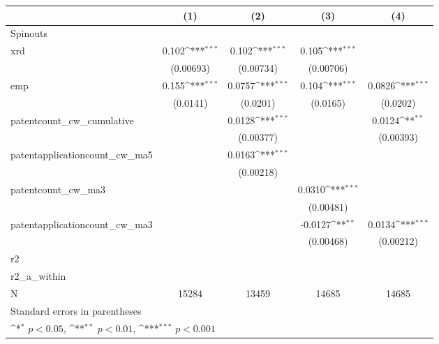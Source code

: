 {
\def\sym#1{\ifmmode^{#1}\else\(^{#1}\)\fi}
\begin{tabular}{l*{4}{c}}
\hline\hline
            &\multicolumn{1}{c}{(1)}         &\multicolumn{1}{c}{(2)}         &\multicolumn{1}{c}{(3)}         &\multicolumn{1}{c}{(4)}         \\
\hline
Spinouts    &                     &                     &                     &                     \\
xrd         &       0.102\sym{***}&       0.102\sym{***}&       0.105\sym{***}&                     \\
            &   (0.00693)         &   (0.00734)         &   (0.00706)         &                     \\
[1em]
emp         &       0.155\sym{***}&      0.0757\sym{***}&       0.104\sym{***}&      0.0826\sym{***}\\
            &    (0.0141)         &    (0.0201)         &    (0.0165)         &    (0.0202)         \\
[1em]
patentcount\_cw\_cumulative&                     &      0.0128\sym{***}&                     &      0.0124\sym{**} \\
            &                     &   (0.00377)         &                     &   (0.00393)         \\
[1em]
patentapplicationcount\_cw\_ma5&                     &      0.0163\sym{***}&                     &                     \\
            &                     &   (0.00218)         &                     &                     \\
[1em]
patentcount\_cw\_ma3&                     &                     &      0.0310\sym{***}&                     \\
            &                     &                     &   (0.00481)         &                     \\
[1em]
patentapplicationcount\_cw\_ma3&                     &                     &     -0.0127\sym{**} &      0.0134\sym{***}\\
            &                     &                     &   (0.00468)         &   (0.00212)         \\
\hline
r2          &                     &                     &                     &                     \\
r2\_a\_within &                     &                     &                     &                     \\
N           &       15284         &       13459         &       14685         &       14685         \\
\hline\hline
\multicolumn{5}{l}{\footnotesize Standard errors in parentheses}\\
\multicolumn{5}{l}{\footnotesize \sym{*} \(p<0.05\), \sym{**} \(p<0.01\), \sym{***} \(p<0.001\)}\\
\end{tabular}
}
